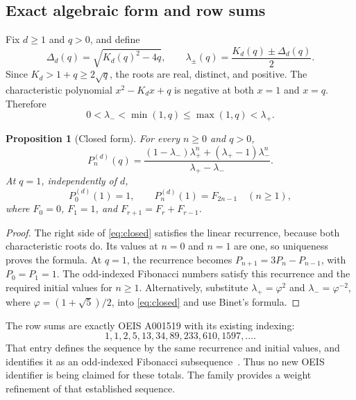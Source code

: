 \documentclass[11pt,letterpaper]{article}
\numberwithin{equation}{section}
\newtheorem{proposition}[theorem]{Proposition}
\theoremstyle{definition}
\begin{document}
\subsection{Exact algebraic form and row sums}

Fix $d\geq1$ and $q>0$, and define
\begin{equation}\label{eq:roots}
 \Delta_d(q)=\sqrt{K_d(q)^2-4q},\qquad
 \lambda_\pm(q)=\frac{K_d(q)\pm\Delta_d(q)}{2}.
\end{equation}
Since $K_d>1+q\geq2\sqrt q$, the roots are real, distinct, and positive.
The characteristic polynomial $x^2-K_dx+q$ is negative at both $x=1$ and
$x=q$. Therefore
\begin{equation}\label{eq:rootbounds}
 0<\lambda_-<\min(1,q)\leq\max(1,q)<\lambda_+.
\end{equation}

\begin{proposition}[Closed form]\label{prop:closed}
For every $n\geq0$ and $q>0$,
\begin{equation}\label{eq:closed}
 P_n^{(d)}(q)=
 \frac{(1-\lambda_-)\lambda_+^n+
             (\lambda_+-1)\lambda_-^n}{\lambda_+-\lambda_-}.
\end{equation}
At $q=1$, independently of $d$,
\begin{equation}\label{eq:fibonacci}
 P_0^{(d)}(1)=1,\qquad
 P_n^{(d)}(1)=F_{2n-1}\quad(n\geq1),
\end{equation}
where $F_0=0$, $F_1=1$, and $F_{r+1}=F_r+F_{r-1}$.
\end{proposition}
\begin{proof}
The right side of \eqref{eq:closed} satisfies the linear recurrence, because
both characteristic roots do. Its values at $n=0$ and $n=1$ are one, so
uniqueness proves the formula. At $q=1$, the recurrence becomes
$P_{n+1}=3P_n-P_{n-1}$, with $P_0=P_1=1$. The odd-indexed Fibonacci numbers
satisfy this recurrence and the required initial values for $n\geq1$.
Alternatively, substitute $\lambda_+=\varphi^2$ and
$\lambda_-=\varphi^{-2}$, where $\varphi=(1+\sqrt5)/2$, into
\eqref{eq:closed} and use Binet's formula.
\end{proof}

The row sums are exactly OEIS A001519 with its existing indexing:
\[
 1,1,2,5,13,34,89,233,610,1597,\ldots.
\]
That entry defines the sequence by the same recurrence and initial values,
and identifies it as an odd-indexed Fibonacci subsequence~\cite{OEIS}.
Thus no new OEIS identifier is being claimed for these totals. The family
provides a weight refinement of that established sequence.
\end{document}
